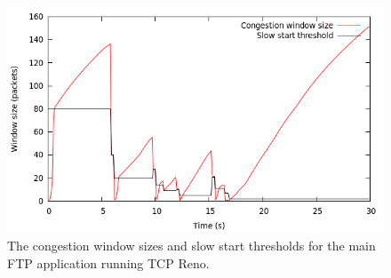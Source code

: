 \documentclass[a4paper,10pt]{article}
\begin{document}
\begin{enumerate}
 \begin{figure}[h]
 \label{fig:ex2congestionwindowreno}
  \centering
    \includegraphics[scale=0.5]{ex2congestionwindowreno.png}
  \caption{The congestion window sizes and slow start thresholds for the main FTP application running TCP Reno.}
 \end{figure}
 
 
\end{enumerate}
\end{document}
